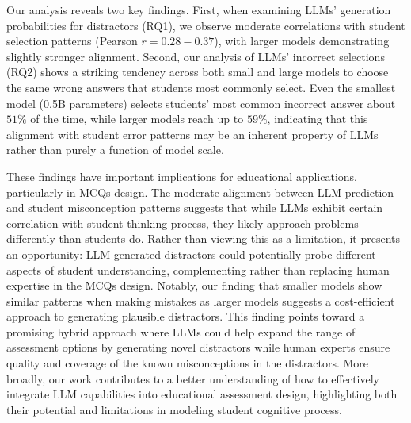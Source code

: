 Our analysis reveals two key findings. First, when examining LLMs' generation probabilities for distractors (RQ1), we observe moderate correlations with student selection patterns (Pearson $r=0.28-0.37$), with larger models demonstrating slightly stronger alignment. Second, our analysis of LLMs' incorrect selections (RQ2) shows a striking tendency across both small and large models to choose the same wrong answers that students most commonly select. Even the smallest model (0.5B parameters) selects students' most common incorrect answer about $51\%$ of the time, while larger models reach up to $59\%$, indicating that this alignment with student error patterns may be an inherent property of LLMs rather than purely a function of model scale.


These findings have important implications for educational applications, particularly in MCQs design. The moderate alignment between LLM prediction and student misconception patterns suggests that while LLMs exhibit certain correlation with student thinking process, they likely approach problems differently than students do. Rather than viewing this as a limitation, it presents an opportunity: LLM-generated distractors could potentially probe different aspects of student understanding, complementing rather than replacing human expertise in the MCQs design. Notably, our finding that smaller models show similar patterns when making mistakes as larger models suggests a cost-efficient approach to generating plausible distractors. This finding points toward a promising hybrid approach where LLMs could help expand the range of assessment options by generating novel distractors while human experts ensure quality and coverage of the known misconceptions in the distractors. More broadly, our work contributes to a better understanding of how to effectively integrate LLM capabilities into educational assessment design, highlighting both their potential and limitations in modeling student cognitive process.

